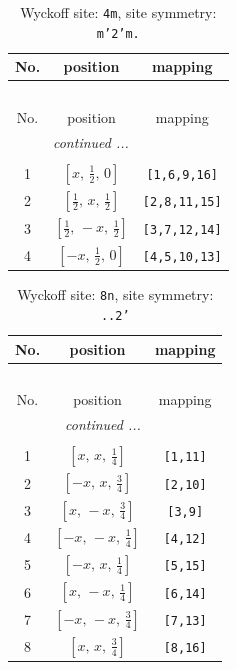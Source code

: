 \documentclass[fleqn,8pt]{jsarticle}
\begin{document}
\renewcommand{\arraystretch}{1.2}
\begin{longtable}{ccc}
\caption{Wyckoff site: {\tt 4m}, site symmetry: {\tt m'2'm.}}
 \\
 \hline \hline
No. & position & mapping \\ \hline \endfirsthead

\multicolumn{2}{l}{\tablename\ \thetable{}} \\
 \hline \hline
No. & position & mapping \\ \hline \endhead

 \hline \hline
\multicolumn{2}{r}{\footnotesize\it continued ...} \\ \endfoot

 \hline \hline
\multicolumn{2}{r}{} \\ \endlastfoot

1 & $\left[ x,\, \frac{1}{2},\, 0 \right]$ & {\tt [1,6,9,16]} \\ \hline
2 & $\left[ \frac{1}{2},\, x,\, \frac{1}{2} \right]$ & {\tt [2,8,11,15]} \\ \hline
3 & $\left[ \frac{1}{2},\, - x,\, \frac{1}{2} \right]$ & {\tt [3,7,12,14]} \\ \hline
4 & $\left[ - x,\, \frac{1}{2},\, 0 \right]$ & {\tt [4,5,10,13]} \\
\end{longtable}
\renewcommand{\arraystretch}{1.2}
\begin{longtable}{ccc}
\caption{Wyckoff site: {\tt 8n}, site symmetry: {\tt ..2'}}
 \\
 \hline \hline
No. & position & mapping \\ \hline \endfirsthead

\multicolumn{2}{l}{\tablename\ \thetable{}} \\
 \hline \hline
No. & position & mapping \\ \hline \endhead

 \hline \hline
\multicolumn{2}{r}{\footnotesize\it continued ...} \\ \endfoot

 \hline \hline
\multicolumn{2}{r}{} \\ \endlastfoot

1 & $\left[ x,\, x,\, \frac{1}{4} \right]$ & {\tt [1,11]} \\ \hline
2 & $\left[ - x,\, x,\, \frac{3}{4} \right]$ & {\tt [2,10]} \\ \hline
3 & $\left[ x,\, - x,\, \frac{3}{4} \right]$ & {\tt [3,9]} \\ \hline
4 & $\left[ - x,\, - x,\, \frac{1}{4} \right]$ & {\tt [4,12]} \\ \hline
5 & $\left[ - x,\, x,\, \frac{1}{4} \right]$ & {\tt [5,15]} \\ \hline
6 & $\left[ x,\, - x,\, \frac{1}{4} \right]$ & {\tt [6,14]} \\ \hline
7 & $\left[ - x,\, - x,\, \frac{3}{4} \right]$ & {\tt [7,13]} \\ \hline
8 & $\left[ x,\, x,\, \frac{3}{4} \right]$ & {\tt [8,16]} \\
\end{longtable}
\end{document}
